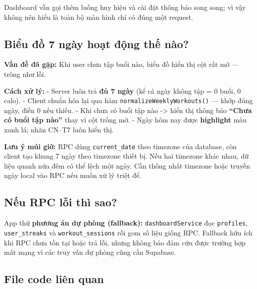 \documentclass[12pt,a4paper]{article}
\begin{document}
Dashboard vẫn gọi thêm luồng huy hiệu và cài đặt thông báo song song; vì
vậy không nên hiểu là toàn bộ màn hình chỉ có đúng một request.

\subsection{Biểu đồ 7 ngày hoạt động thế
nào?}\label{biux1ec3u-ux111ux1ed3-7-nguxe0y-houx1ea1t-ux111ux1ed9ng-thux1ebf-nuxe0o}

\textbf{Vấn đề đã gặp:} Khi user chưa tập buổi nào, biểu đồ hiển thị cột
rất mờ --- trông như lỗi.

\textbf{Cách xử lý:} - Server luôn trả \textbf{đủ 7 ngày} (kể cả ngày
không tập = 0 buổi, 0 calo). - Client chuẩn hóa lại qua hàm
\texttt{normalizeWeeklyWorkouts()} --- khớp đúng ngày, điền 0 nếu thiếu.
- Khi chưa có buổi tập nào -\textgreater{} hiển thị thông báo
\textbf{``Chưa có buổi tập nào''} thay vì cột trống mờ. - Ngày hôm nay
được \textbf{highlight} màu xanh lá; nhãn CN--T7 luôn hiển thị.

\textbf{Lưu ý múi giờ:} RPC dùng \texttt{current\_date} theo timezone
của database, còn client tạo khung 7 ngày theo timezone thiết bị. Nếu
hai timezone khác nhau, dữ liệu quanh nửa đêm có thể lệch một ngày. Cần
thống nhất timezone hoặc truyền ngày local vào RPC nếu muốn xử lý triệt
để.

\subsection{Nếu RPC lỗi thì
sao?}\label{nux1ebfu-rpc-lux1ed7i-thuxec-sao}

App thử \textbf{phương án dự phòng (fallback):}
\texttt{dashboardService} đọc \texttt{profiles}, \texttt{user\_streaks}
và \texttt{workout\_sessions} rồi gom số liệu giống RPC. Fallback hữu
ích khi RPC chưa tồn tại hoặc trả lỗi, nhưng không bảo đảm cứu được
trường hợp mất mạng vì các truy vấn dự phòng cũng cần Supabase.

\subsection{File code liên quan}\label{file-code-liuxean-quan}
\end{document}
